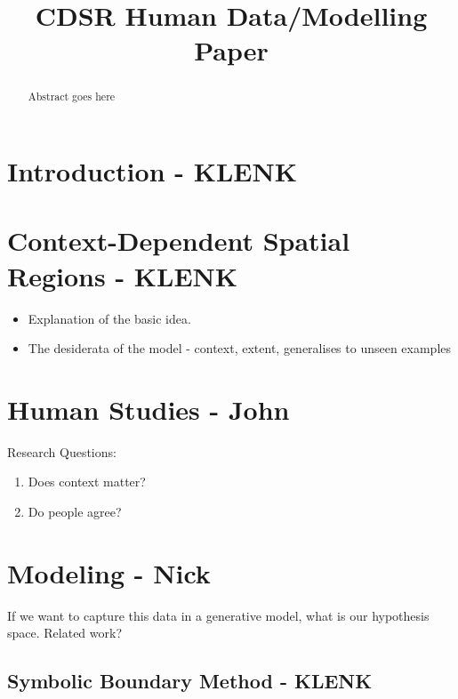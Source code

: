 \documentclass[11pt,letterpaper]{article}
\begin{document}
 

\title{CDSR Human Data/Modelling Paper}
 
\vskip 0.2in
 
\begin{abstract}
Abstract goes here
\end{abstract}

\section{Introduction - KLENK} 
 
\section{Context-Dependent Spatial Regions - KLENK}

\begin{itemize}
	\item Explanation of the basic idea.
	\item The desiderata of the model - context, extent, generalises to unseen examples

\end{itemize}



\section{Human Studies - John}
Research Questions: 
\begin{enumerate}
	\item Does context matter?
	\item Do people agree? 
\end{enumerate}
 

\section{Modeling - Nick}
If we want to capture this data in a generative model, what is our hypothesis space. 
Related work? 

\subsection{Symbolic Boundary Method - KLENK}
\end{document}
